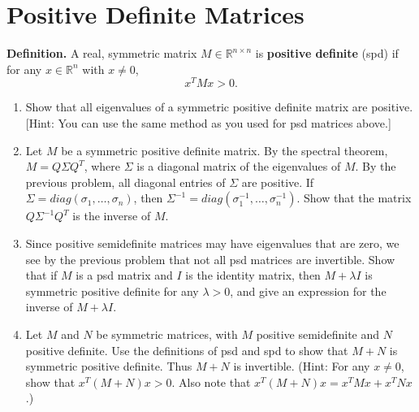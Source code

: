 \documentclass{article}
\theoremstyle{plain}
\theoremstyle{definition}
\begin{document}
\section{Positive Definite Matrices}
{\bf Definition. }
A real, symmetric matrix $M\in\mathbb{R}^{n\times n}$ is \textbf{positive
definite} (spd) if for any $x\in\mathbb{R}^{n}$ with $x\neq0$, 
\[
x^{T}Mx>0.
\]
\begin{enumerate}
\item Show that all eigenvalues of a symmetric positive definite matrix
are positive. {[}Hint: You can use the same method as you used for
psd matrices above.{]} 
\item Let $M$ be a symmetric positive definite matrix. By the spectral
theorem, $M=Q\Sigma Q^{T}$, where $\Sigma$ is a diagonal matrix
of the eigenvalues of $M$. By the previous problem, all diagonal
entries of $\Sigma$ are positive. If $\Sigma=diag\left(\sigma_{1},\ldots,\sigma_{n}\right)$,
then $\Sigma^{-1}=diag\left(\sigma_{1}^{-1},\ldots,\sigma_{n}^{-1}\right)$.
Show that the matrix $Q\Sigma^{-1}Q^{T}$ is the inverse of $M$. 
\item Since positive semidefinite matrices may have eigenvalues that are
zero, we see by the previous problem that not all psd matrices are
invertible. Show that if $M$ is a psd matrix and $I$ is the identity
matrix, then $M+\lambda I$ is symmetric positive definite for any
$\lambda>0$, and give an expression for the inverse of $M+\lambda I$.
\item Let $M$ and $N$ be symmetric matrices, with $M$ positive semidefinite
and $N$ positive definite. Use the definitions of psd and spd to
show that $M+N$ is symmetric positive definite. Thus $M+N$ is invertible.
(Hint: For any $x\neq0$, show that $x^{T}(M+N)x>0$. Also note that
$x^{T}(M+N)x=x^{T}Mx+x^{T}Nx$.) 
\end{enumerate}
\end{document}
